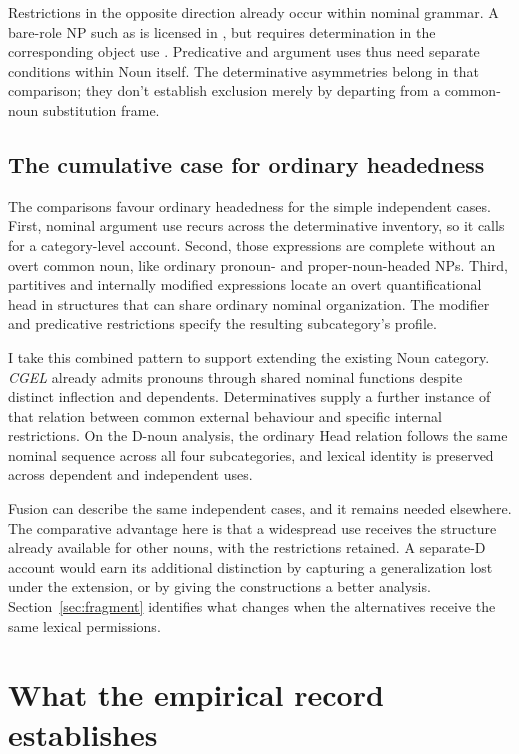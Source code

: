 \documentclass[12pt]{article}
\begin{document}
Restrictions in the opposite direction already occur within nominal grammar. A bare-role NP such as  is licensed in , but requires determination in the corresponding object use  \citep[328]{huddleston2002}. Predicative and argument uses thus need separate conditions within Noun itself. The determinative asymmetries belong in that comparison; they don't establish exclusion merely by departing from a common-noun substitution frame.

\subsection{The cumulative case for ordinary headedness}\label{sec:cumulative}

The comparisons favour ordinary headedness for the simple independent cases. First, nominal argument use recurs across the determinative inventory, so it calls for a category-level account. Second, those expressions are complete without an overt common noun, like ordinary pronoun- and proper-noun-headed NPs. Third, partitives and internally modified expressions locate an overt quantificational head in structures that can share ordinary nominal organization. The modifier and predicative restrictions specify the resulting subcategory's profile.

I take this combined pattern to support extending the existing Noun category. \textit{CGEL} already admits pronouns through shared nominal functions despite distinct inflection and dependents. Determinatives supply a further instance of that relation between common external behaviour and specific internal restrictions. On the D-noun analysis, the ordinary Head relation follows the same nominal sequence across all four subcategories, and lexical identity is preserved across dependent and independent uses.

Fusion can describe the same independent cases, and it remains needed elsewhere. The comparative advantage here is that a widespread use receives the structure already available for other nouns, with the restrictions retained. A separate-D account would earn its additional distinction by capturing a generalization lost under the extension, or by giving the constructions a better analysis. Section~\ref{sec:fragment} identifies what changes when the alternatives receive the same lexical permissions.

\section{What the empirical record establishes}\label{sec:empirical}
\end{document}
